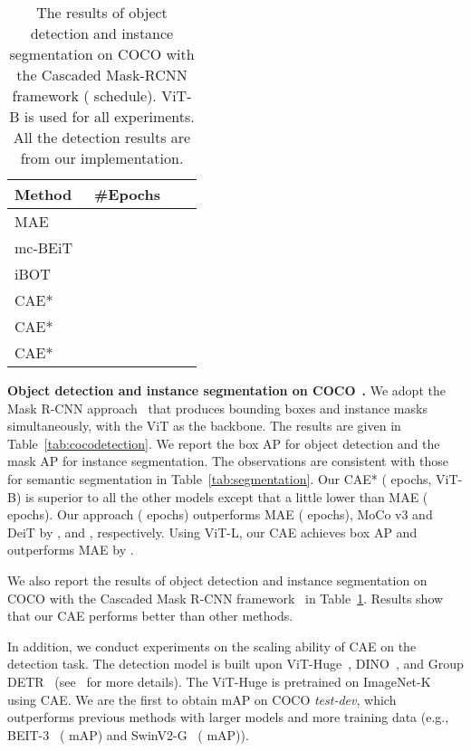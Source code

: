 \documentclass[twocolumn]{svjour3}          \smartqed  \usepackage{graphicx}
\def \ours {CAE*\xspace}
\begin{document}
\begin{table}[t]
    \centering
    \caption{
    The results of object detection and instance segmentation on COCO with the Cascaded Mask-RCNN framework ( schedule). 
    ViT-B is used for all experiments.
    All the detection results
    are from our implementation.
    } 
    \setlength{\tabcolsep}{13pt}
\renewcommand{\arraystretch}{1.1}
    \small
        \begin{tabular}{l c c c}
        \toprule
            \multirow{1}{*}{Method} & \multirow{1}{*}{\#Epochs} &
             &  \\
        \midrule
        MAE~\cite{he2021masked}  &  &  &  \\
        mc-BEiT~\cite{zhou2021ibot}   &  &   &  \\
        iBOT~\cite{zhou2021ibot}  &   &   &  \\ 
        \ours  &   &  &  \\
        \ours  &   &  &   \\
        \ours  &  &  &   \\
        \bottomrule     
    \end{tabular} 
    \label{tab:det_cascade}
\end{table}






 \vspace{1mm}
\noindent\textbf{Object detection and instance segmentation on COCO}~\cite{lin2014microsoft}\textbf{.}
We adopt the Mask R-CNN approach~\cite{he2017mask}
that produces bounding boxes and instance masks simultaneously,
with the ViT as the backbone.
The results are given in Table~\ref{tab:cocodetection}.
We report the box AP for object detection and the mask AP for
instance segmentation.
The observations are consistent with those for semantic segmentation
in Table~\ref{tab:segmentation}.
Our CAE* ( epochs, ViT-B)
is superior to
all the other models except 
that a little lower than
MAE ( epochs).
Our approach ( epochs)
outperforms MAE ( epochs),
MoCo v3 and
DeiT by ,  and , respectively. Using ViT-L, our CAE achieves  box AP and outperforms MAE by .

We also report the results of object detection and instance segmentation on COCO with the Cascaded Mask R-CNN framework~\cite{ZhaoweiCai2021CascadeRH} in Table~\ref{tab:det_cascade}. Results show that our CAE performs better than other methods.


In addition, we conduct experiments on the scaling ability of CAE on the detection task. The detection model is built upon ViT-Huge~\cite{DosovitskiyB0WZ21}, DINO~\cite{HaoZhang2023DINODW}, and Group DETR~\cite{QiangChen2022GroupDF}
(see~\cite{groupdetrv2} for more details). The ViT-Huge is pretrained on ImageNet-K~\cite{deng2009imagenet} using CAE. 
We are the first to obtain  mAP on COCO \textit{test-dev}, 
which outperforms previous methods with larger models and more training data (e.g., BEIT-3~\cite{WenhuiWang2023ImageAA} ( mAP) and SwinV2-G~\cite{ZeLiu2021SwinTV} ( mAP)).
\end{document}
